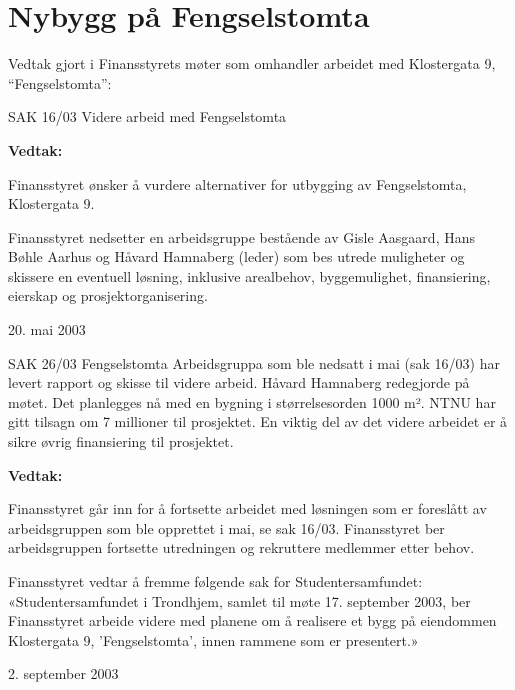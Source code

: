\chapter*{Nybygg på Fengselstomta}

Vedtak gjort i Finansstyrets møter som omhandler arbeidet med Klostergata 9,
``Fengselstomta'':

\begin{instruksledd}{SAK 16/03 Videre arbeid med Fengselstomta}
    
    \textbf{Vedtak:}
    
    Finansstyret ønsker å vurdere alternativer for utbygging av Fengselstomta, Klostergata
    9.

    Finansstyret nedsetter en arbeidsgruppe bestående av Gisle Aasgaard, Hans Bøhle Aarhus
    og Håvard Hamnaberg
    (leder) som bes utrede muligheter og skissere en eventuell løsning, inklusive
    arealbehov, byggemulighet, finansiering,
    eierskap og prosjektorganisering.
    
    20. mai 2003

\end{instruksledd}

\begin{instruksledd}{SAK 26/03 Fengselstomta}
    Arbeidsgruppa som ble nedsatt i mai (sak 16/03) har levert rapport og skisse til
    videre arbeid. Håvard Hamnaberg
    redegjorde på møtet. Det planlegges nå med en bygning i størrelsesorden 1000 m². NTNU
    har gitt tilsagn om
    7 millioner til prosjektet. En viktig del av det videre arbeidet er å sikre øvrig
    finansiering til prosjektet.

    \textbf{Vedtak:}
    
    Finansstyret går inn for å fortsette arbeidet med løsningen som er foreslått av
    arbeidsgruppen som ble opprettet i mai,
    se sak 16/03. Finansstyret ber arbeidsgruppen fortsette utredningen og rekruttere
    medlemmer etter behov.
    
    Finansstyret vedtar å fremme følgende sak for Studentersamfundet:
    «Studentersamfundet i Trondhjem, samlet til møte 17. september 2003, ber Finansstyret
    arbeide videre med planene
    om å realisere et bygg på eiendommen Klostergata 9, ’Fengselstomta’, innen rammene som
    er presentert.»
    
    2. september 2003

\end{instruksledd}

